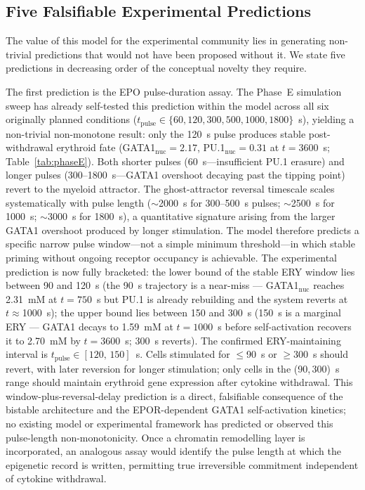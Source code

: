 \subsection{Five Falsifiable Experimental Predictions}

The value of this model for the experimental community lies in generating non-trivial predictions that would not have been proposed without it. We state five predictions in decreasing order of the conceptual novelty they require.

The first prediction is the EPO pulse-duration assay. The Phase~E simulation sweep has already self-tested this prediction within the model across all six originally planned conditions ($t_{\mathrm{pulse}} \in \{60, 120, 300, 500, 1000, 1800\}$~s), yielding a non-trivial non-monotone result: only the 120~s pulse produces stable post-withdrawal erythroid fate (GATA1$_\text{nuc}=2.17$, PU.1$_\text{nuc}=0.31$ at $t=3600$~s; Table~\ref{tab:phaseE}). Both shorter pulses (60~s---insufficient PU.1 erasure) and longer pulses (300--1800~s---GATA1 overshoot decaying past the tipping point) revert to the myeloid attractor. The ghost-attractor reversal timescale scales systematically with pulse length ($\sim$2000~s for 300--500~s pulses; $\sim$2500~s for 1000~s; $\sim$3000~s for 1800~s), a quantitative signature arising from the larger GATA1 overshoot produced by longer stimulation. The model therefore predicts a specific narrow pulse window---not a simple minimum threshold---in which stable priming without ongoing receptor occupancy is achievable. The experimental prediction is now fully bracketed: the lower bound of the stable ERY window lies between 90 and 120~s (the 90~s trajectory is a near-miss --- GATA1$_\text{nuc}$ reaches 2.31~mM at $t=750$~s but PU.1 is already rebuilding and the system reverts at $t\approx$1000~s); the upper bound lies between 150 and 300~s (150~s is a marginal ERY --- GATA1 decays to 1.59~mM at $t=1000$~s before self-activation recovers it to 2.70~mM by $t=3600$~s; 300~s reverts). The confirmed ERY-maintaining interval is $t_{\mathrm{pulse}} \in [120,\,150]$~s. Cells stimulated for $\leq$90~s or $\geq$300~s should revert, with later reversion for longer stimulation; only cells in the (90,\,300)~s range should maintain erythroid gene expression after cytokine withdrawal. This window-plus-reversal-delay prediction is a direct, falsifiable consequence of the bistable architecture and the EPOR-dependent GATA1 self-activation kinetics; no existing model or experimental framework has predicted or observed this pulse-length non-monotonicity. Once a chromatin remodelling layer is incorporated, an analogous assay would identify the pulse length at which the epigenetic record is written, permitting true irreversible commitment independent of cytokine withdrawal.

